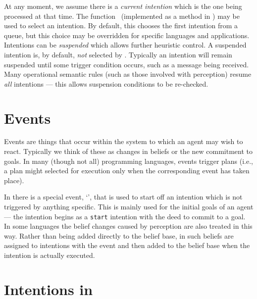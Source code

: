 At any moment, we assume there is a \emph{current intention} which is
the one being processed at that time.  The function
\AILselectintention\ (implemented as a method in \ail) may be used
to select an intention.  By default, this chooses the first intention
from a queue, but this choice may be overridden for specific languages
and applications.  Intentions can be
\emph{suspended} which allows further
heuristic control.  A suspended intention is, by default, \emph{not}
selected by \AILselectintention.  Typically an intention will remain
suspended until some trigger condition occurs, such as a message being
received.  Many operational semantic rules (such as those involved
with perception) resume \emph{all}
intentions --- this allows suspension conditions to be re-checked.

\section{Events}

Events are things that occur within the system to which an agent may
wish to react.  Typically we think of these as changes in
beliefs or the new commitment to
goals.  In many (though not all) programming
languages, events trigger plans (i.e., a plan might selected for
execution only when the corresponding event has taken place).

In \ail{} there is a special event, `\AILstart{}', that is used to
start off an intention which is not triggered by anything specific.
This is mainly used for the initial goals of an agent --- the
intention begins as a \texttt{start} intention with the deed to commit
to a goal.  In some languages the belief changes
caused by perception are also treated in this way.  Rather than being
added directly to the belief base, in \ail{} such beliefs are assigned
to intentions with the event \AILstart{} and then added to the belief
base when the intention is actually executed.

\section{Intentions in \gwendolen}

